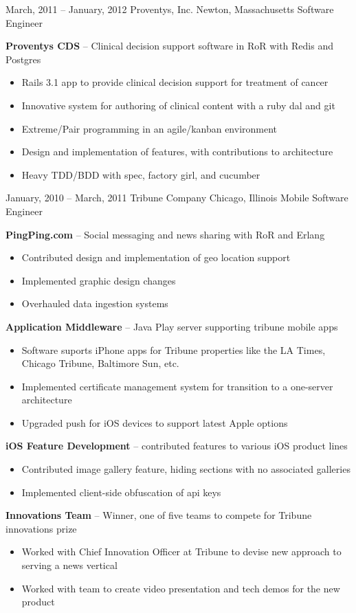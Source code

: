 \documentclass[]{friggeri-cv}
\begin{document}
\begin{entrylist}
    \entryalt
    {March, 2011 -- January, 2012}
    {Proventys, Inc.}
    {Newton, Massachusetts}
    {Software Engineer}
    {\textbf{Proventys CDS} -- Clinical decision support software in RoR with Redis and Postgres
    \begin{itemize}
      \item Rails 3.1 app to provide clinical decision support for treatment of cancer
      \item Innovative system for authoring of clinical content with a ruby dal and git
      \item Extreme/Pair programming in an agile/kanban environment
      \item Design and implementation of features, with contributions to architecture
      \item Heavy TDD/BDD with spec, factory girl, and cucumber     
    \end{itemize}}
    
    \entryalt
    {January, 2010 -- March, 2011}
    {Tribune Company}
    {Chicago, Illinois}
    {Mobile Software Engineer}
    {\textbf{PingPing.com} -- Social messaging and news sharing with RoR and Erlang
    \begin{itemize}
      \item Contributed design and implementation of geo location support
      \item Implemented graphic design changes
      \item Overhauled data ingestion systems
    \end{itemize}
    \textbf{Application Middleware} -- Java Play server supporting tribune mobile apps
    \begin{itemize}
      \item Software suports iPhone apps for Tribune properties like the LA Times, Chicago Tribune, Baltimore Sun, etc.
      \item Implemented certificate management system for transition to a one-server architecture
      \item Upgraded push for iOS devices to support latest Apple options
    \end{itemize}
    \textbf{iOS Feature Development} -- contributed features to various iOS product lines
    \begin{itemize}
      \item Contributed image gallery feature, hiding sections with no associated galleries
      \item Implemented client-side obfuscation of api keys
    \end{itemize}
    \textbf{Innovations Team} -- Winner, one of five teams to compete for Tribune innovations prize
    \begin{itemize}
      \item Worked with Chief Innovation Officer at Tribune to devise new approach to serving a news vertical
      \item Worked with team to create video presentation and tech demos for the new product
    \end{itemize}}

\end{entrylist}
\end{document}

